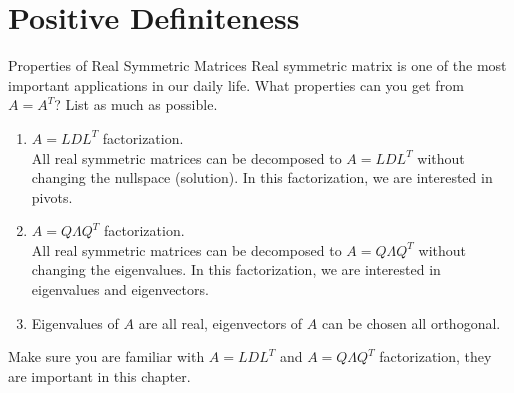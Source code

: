 \documentclass{beamer}
\begin{document}
\section{Positive Definiteness}
\begin{frame}{Properties of Real Symmetric Matrices}
Real symmetric matrix is one of the most important applications in our daily life. What properties can you get from $A=A^T$? List as much as possible.

\begin{enumerate}
    \item $A=LDL^T$ factorization.\\
    All real symmetric matrices can be decomposed to $A=LDL^T$ without changing the nullspace (solution). In this factorization, we are interested in pivots.
    \item $A=Q\varLambda Q^T$ factorization.\\
    All real symmetric matrices can be decomposed to $A=Q\varLambda Q^T$ without changing the eigenvalues. In this factorization, we are interested in eigenvalues and eigenvectors.
    \item Eigenvalues of $A$ are all real, eigenvectors of $A$ can be chosen all orthogonal.
\end{enumerate}

Make sure you are familiar with $A=LDL^T$ and $A=Q\varLambda Q^T$ factorization, they are important in this chapter.
\end{frame}
\end{document}
